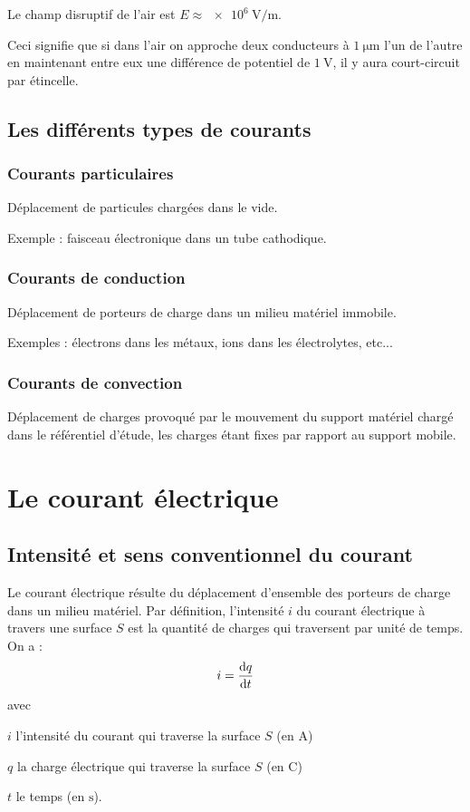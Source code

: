 Le champ disruptif de l'air est \(E\approx\SI{e6}{\volt\per\meter}\).

Ceci signifie que si dans l'air on approche deux conducteurs à \(\SI{1}{\micro\meter}\) l'un de l'autre en maintenant entre eux une différence de potentiel de \(\SI{1}{\volt}\), il y aura court-circuit par étincelle.

\subsection{Les différents types de courants}

\subsubsection{Courants particulaires}

Déplacement de particules chargées dans le vide.

Exemple : faisceau électronique dans un tube cathodique.

\subsubsection{Courants de conduction}

Déplacement de porteurs de charge dans un milieu matériel immobile.

Exemples : électrons dans les métaux, ions dans les électrolytes, etc...

\subsubsection{Courants de convection}

Déplacement de charges provoqué par le mouvement du support matériel chargé dans le référentiel d'étude, les charges étant fixes par rapport au support mobile.

\section{Le courant électrique}

\subsection{Intensité et sens conventionnel du courant}

Le courant électrique résulte du déplacement d'ensemble des porteurs de charge dans un milieu matériel. Par définition, l'intensité \(i\) du courant électrique à travers une surface \(S\) est la quantité de charges qui traversent par unité de temps. On a : \[i=\odv{q}{t}\] avec \begin{description}
\item \(i\) l'intensité du courant qui traverse la surface \(S\) (en \(\unit{\ampere}\))
\item \(q\) la charge électrique qui traverse la surface \(S\) (en \(\unit{\coulomb}\))
\item \(t\) le temps (en \(\unit{\second}\)). \\
\end{description}

